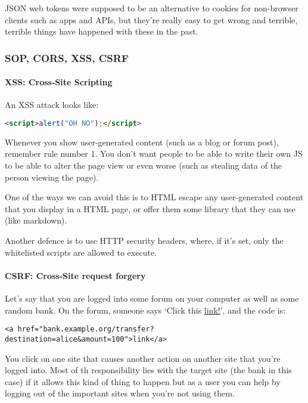 \documentclass[11pt,a4paper,titlepage,dvipsnames,cmyk]{scrartcl}
\begin{document}
JSON web tokens were supposed to be an alternative to cookies for
non-browser clients such as apps and APIs, but they're really easy to get
wrong and terrible, terrible things have happened with these in the past.

\subsubsection{SOP, CORS, XSS, CSRF}%
\label{ssub:SOP, CORS, XSS, CSRF}

\paragraph{XSS: Cross-Site Scripting}%
\label{par:XSS}

An XSS attack looks like:

\begin{lstlisting}[language=HTML]
<script>alert("OH NO");</script>
\end{lstlisting}

Whenever you show user-generated content (such as a blog or forum post),
remember rule number 1. You don't want people to be able to write their
own JS to be able to alter the page view or even worse (such as stealing
data of the person viewing the page).

One of the ways we can avoid this is to HTML escape any user-generated
content that you display in a HTML page, or offer them some library that
they can use (like markdown).

Another defence is to use HTTP security headers, where, if it's set, only
the whitelisted scripts are allowed to execute.

\paragraph{CSRF: Cross-Site request forgery}%
\label{par:CSRF: Cross-Site request forgery}

Let's say that you are logged into some forum on your computer as well as
some random bank. On the forum, someone says `Click this
\underline{link!}', and the code is:

\begin{lstlisting}
<a href="bank.example.org/transfer?destination=alice&amount=100">link</a>
\end{lstlisting}

You click on one site that causes another action on another site that
you're logged into. Most of th responsibility lies with the target site
(the bank in this case) if it allows this kind of thing to happen but as a
user you can help by logging out of the important sites when you're not
using them.
\end{document}
